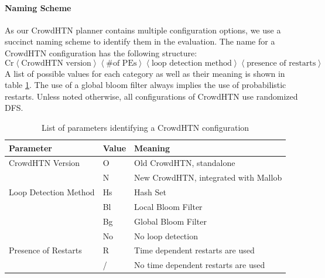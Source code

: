 \paragraph{Naming Scheme}
As our CrowdHTN planner contains multiple configuration options, we use a succinct naming scheme to identify them in the evaluation. The name for a CrowdHTN configuration has the following structure:
\[
	\text{Cr}
	\left\langle \text{CrowdHTN version} \right\rangle
	\left\langle \# \text{of PEs} \right\rangle
	\left\langle \text{loop detection method} \right\rangle
	\left\langle \text{presence of restarts} \right\rangle
\]
A list of possible values for each category as well as their meaning is shown in table \ref{table: crowd configs}. The use of a global bloom filter always implies the use of probabilistic restarts. Unless noted otherwise, all configurations of CrowdHTN use randomized DFS.
\begin{table}[!hbp]
	\caption{List of parameters identifying a CrowdHTN configuration}
	\label{table: crowd configs}
	\centering
	\begin{tabular}{|l|l|l|}
		\hline
		Parameter & Value & Meaning \\
		\hline
		CrowdHTN Version & O & Old CrowdHTN, standalone \\
		 			     & N & New CrowdHTN, integrated with Mallob \\
		\hline
		Loop Detection Method & Hs & Hash Set \\
							  & Bl & Local Bloom Filter \\
							  & Bg & Global Bloom Filter \\
							  & No & No loop detection \\
		\hline
		Presence of Restarts & R & Time dependent restarts are used \\
							 & / & No time dependent restarts are used \\
		\hline
	\end{tabular}
\end{table}

